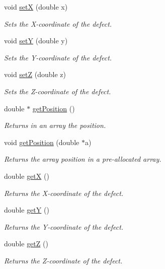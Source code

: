 \begin{DoxyCompactItemize}
void \hyperlink{classDefect_a5a65f73da6a572d9e7109b31239e441d}{set\-X} (double x)
\begin{DoxyCompactList}\small\item\em Sets the X-\/coordinate of the defect. \end{DoxyCompactList}\item 
void \hyperlink{classDefect_a268606391a4eaee3de029d2005648b6f}{set\-Y} (double y)
\begin{DoxyCompactList}\small\item\em Sets the Y-\/coordinate of the defect. \end{DoxyCompactList}\item 
void \hyperlink{classDefect_abb0b16c44a1b04d782f5c5f598b49d5b}{set\-Z} (double z)
\begin{DoxyCompactList}\small\item\em Sets the Z-\/coordinate of the defect. \end{DoxyCompactList}\item 
double $\ast$ \hyperlink{classDefect_a6842fba3ad14032766ccf0437afcbced}{get\-Position} ()
\begin{DoxyCompactList}\small\item\em Returns in an array the position. \end{DoxyCompactList}\item 
void \hyperlink{classDefect_aace5c752b85c368631746abc3d5bd714}{get\-Position} (double $\ast$a)
\begin{DoxyCompactList}\small\item\em Returns the array position in a pre-\/allocated array. \end{DoxyCompactList}\item 
double \hyperlink{classDefect_a01b96c453c13db82b5835682e1849dc0}{get\-X} ()
\begin{DoxyCompactList}\small\item\em Returns the X-\/coordinate of the defect. \end{DoxyCompactList}\item 
double \hyperlink{classDefect_a9ea8df3b4c621762a327813056e63911}{get\-Y} ()
\begin{DoxyCompactList}\small\item\em Returns the Y-\/coordinate of the defect. \end{DoxyCompactList}\item 
double \hyperlink{classDefect_a6f59edeca7ca8bfa01c54fd6b1a62374}{get\-Z} ()
\begin{DoxyCompactList}\small\item\em Returns the Z-\/coordinate of the defect. \end{DoxyCompactList}\end{DoxyCompactItemize}
